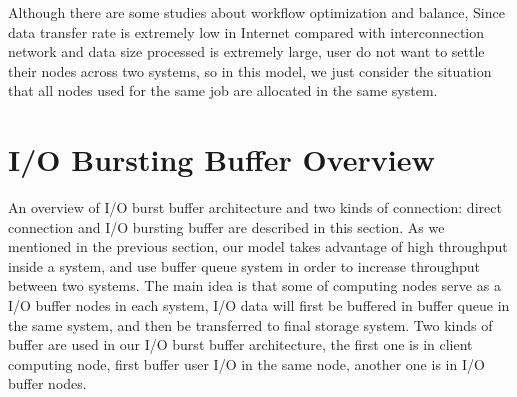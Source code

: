 \documentclass[JIP,draft]{ipsj}
\begin{document}
Although there are some studies about workflow optimization and  balance\cite{Workload}, Since data transfer rate is extremely low in Internet compared with interconnection network and data size processed is extremely large, user do not want to settle their nodes across two systems, so in this model, we just consider the situation that all nodes used for the same job are allocated in the same system.

\section{I/O Bursting Buffer Overview}


An overview of I/O burst buffer architecture and two kinds of connection: direct connection and I/O bursting buffer are described in this section.
As we mentioned in the previous section, our model takes advantage of high throughput inside a system, and use buffer queue system in order to increase throughput between two systems.
The main idea is that some of computing nodes serve as a I/O buffer nodes in each system, I/O data will first be buffered in buffer queue in the same system, and then be transferred to final storage system.
Two kinds of buffer are used in our I/O burst buffer architecture, the first one is in client computing node, first buffer user I/O in the same node, another one is in I/O buffer nodes.



\end{document}
